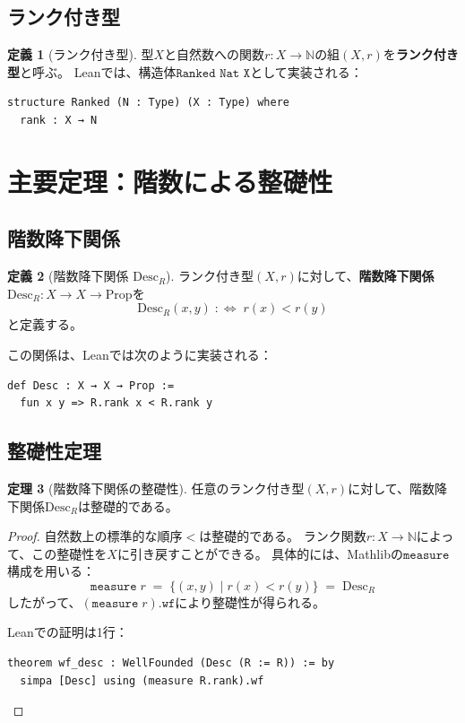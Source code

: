 \documentclass[11pt,a4paper]{ltjsarticle}
\theoremstyle{definition}
\newtheorem{definition}{定義}[section]
\newtheorem{theorem}[definition]{定理}
\begin{document}
\subsection{ランク付き型}

\begin{definition}[ランク付き型]
型$X$と自然数への関数$r : X \to \mathbb{N}$の組$(X, r)$を\textbf{ランク付き型}と呼ぶ。
Leanでは、構造体$\texttt{Ranked Nat X}$として実装される：
\begin{lstlisting}[style=leanstyle]
structure Ranked (N : Type) (X : Type) where
  rank : X → N
\end{lstlisting}
\end{definition}

\section{主要定理：階数による整礎性}

\subsection{階数降下関係}

\begin{definition}[階数降下関係 $\mathrm{Desc}_R$]
\label{def:desc}
ランク付き型$(X, r)$に対して、\textbf{階数降下関係}$\mathrm{Desc}_R : X \to X \to \mathrm{Prop}$を
\[
\mathrm{Desc}_R(x, y) \;:\!\!\iff\; r(x) < r(y)
\]
と定義する。
\end{definition}

この関係は、Leanでは次のように実装される：
\begin{lstlisting}[style=leanstyle]
def Desc : X → X → Prop :=
  fun x y => R.rank x < R.rank y
\end{lstlisting}

\subsection{整礎性定理}

\begin{theorem}[階数降下関係の整礎性]
\label{thm:wf-desc}
任意のランク付き型$(X, r)$に対して、階数降下関係$\mathrm{Desc}_R$は整礎的である。
\end{theorem}

\begin{proof}
自然数上の標準的な順序$<$は整礎的である。
ランク関数$r : X \to \mathbb{N}$によって、この整礎性を$X$に引き戻すことができる。
具体的には、Mathlibの$\texttt{measure}$構成を用いる：
\[
\texttt{measure}\;r \;=\; \{(x, y) \mid r(x) < r(y)\} \;=\; \mathrm{Desc}_R
\]
したがって、$(\texttt{measure}\;r).\texttt{wf}$により整礎性が得られる。

Leanでの証明は1行：
\begin{lstlisting}[style=leanstyle]
theorem wf_desc : WellFounded (Desc (R := R)) := by
  simpa [Desc] using (measure R.rank).wf
\end{lstlisting}
\end{proof}
\end{document}
